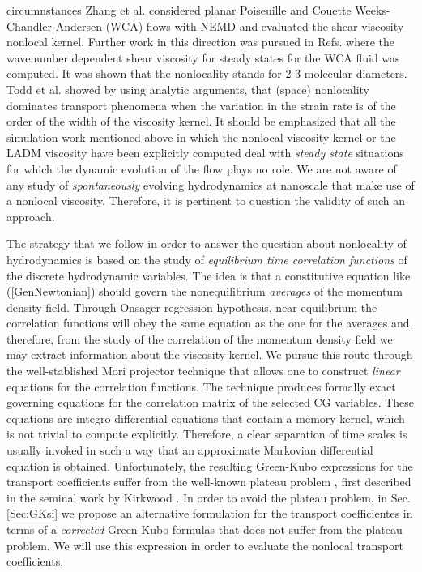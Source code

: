 \documentclass[b5paper,openright,10pt]{book}
\begin{document}
circumnstances  Zhang  et   al.   \cite{Zhang2004}  considered  planar
Poiseuille  and  Couette  Weeks-Chandler-Andersen (WCA) flows  with NEMD  and  evaluated  the  shear
viscosity  nonlocal kernel.  Further  work in
this        direction        was        pursued        in        Refs.
\cite{Hansen2007,Todd2008a,Cadusch2008}    where    the    wavenumber
dependent  shear viscosity  for steady  states for  the WCA fluid was
computed. It was shown that  the nonlocality stands for 2-3 molecular
diameters.   Todd et  al.   \cite{Todd2008} showed  by using  analytic
arguments, that (space) nonlocality dominates transport phenomena when
the variation in the  strain rate is of the order of  the width of the
viscosity kernel.
It should be  emphasized that all the simulation  work mentioned above
in which  the nonlocal  viscosity kernel or  the LADM  viscosity have
been explicitly  computed deal  with \textit{steady  state} situations
for which the dynamic evolution of the  flow plays no role. We are not
aware of any study of \textit{spontaneously} evolving hydrodynamics at
nanoscale that  make use  of a nonlocal  viscosity. Therefore,  it is
pertinent to question the validity of such an approach.

The strategy  that we follow in  order to answer
the question about nonlocality of hydrodynamics is based on the study
of  \textit{equilibrium time  correlation functions}  of the  discrete
hydrodynamic variables.  The idea is that a constitutive equation like
(\ref{GenNewtonian})     should     govern     the     nonequilibrium
\textit{averages}  of the  momentum  density  field.  Through  Onsager
regression hypothesis, near equilibrium the correlation functions will
obey the  same equation as  the one  for the averages  and, therefore,
from the study of the correlation of the momentum density field we may
extract information about the viscosity  kernel.  We pursue this route
through the  well-stablished Mori projector technique  that allows one
to construct \textit{linear} equations  for the correlation functions.
The  technique produces  formally  exact governing  equations for  the
correlation matrix of the selected  CG variables.  These equations are
integro-differential equations that contain  a memory kernel, which is
not trivial to  compute explicitly.  Therefore, a  clear separation of
time  scales is  usually invoked  in such  a way  that an  approximate
Markovian  differential  equation  is  obtained.   Unfortunately,  the
resulting Green-Kubo expressions for the transport coefficients suffer
from   the  well-known   plateau  problem   \cite{Espanol1998},  first
described in the seminal work by Kirkwood \cite{Kirkwood1949}. In order to avoid the plateau problem, in Sec. \ref{Sec:GKsi} we propose an alternative formulation for the transport coefficientes in terms of a  \textit{corrected} Green-Kubo formulas that
does  not suffer  from the  plateau problem. We will use this expression  in order to evaluate the nonlocal
transport coefficients.
\end{document}
